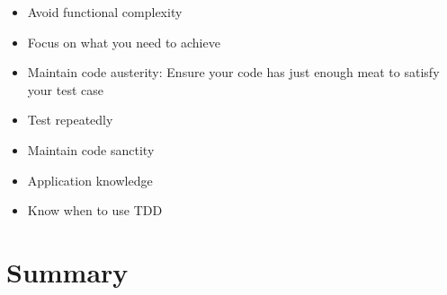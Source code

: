 \documentclass[11pt]{article}
\begin{document}
\begin{itemize}
\item Avoid functional complexity
\item Focus on what you need to achieve
\item Maintain code austerity: Ensure your code has just enough meat to satisfy your test case
\item Test repeatedly
\item Maintain code sanctity
\item Application knowledge
\item Know when to use TDD
\end{itemize}

\section{Summary}
\end{document}
